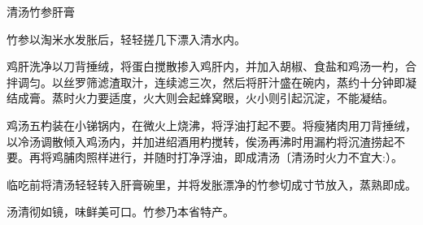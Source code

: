 \begin{recipe}{清汤竹参肝膏}

\ingredients






\cooking

竹参以淘米水发胀后，轻轻搓几下漂入清水内。

鸡肝洗净以刀背捶绒，将蛋白搅散掺入鸡肝内，并加入胡椒、食盐和鸡汤一杓，合拌调匀。以丝罗筛滤渣取汁，连续滤三次，然后将肝汁盛在碗内，蒸约十分钟即凝结成膏。蒸时火力要适度，火大则会起蜂窝眼，火小则引起沉淀，不能凝结。

鸡汤五杓装在小锑锅内，在微火上烧沸，将浮油打起不要。将瘦猪肉用刀背捶绒，以冷汤调散倾入鸡汤内，并加进绍酒用杓搅转，俟汤再沸时用漏杓将沉渣捞起不要。再将鸡脯肉照样进行，并随时打净浮油，即成清汤〔清汤时火力不宜大:）。

临吃前将清汤轻轻转入肝膏碗里，并将发胀漂净的竹参切成寸节放入，蒸熟即成。

\notes

汤清彻如镜，味鲜美可口。竹参乃本省特产。

\end{recipe}

